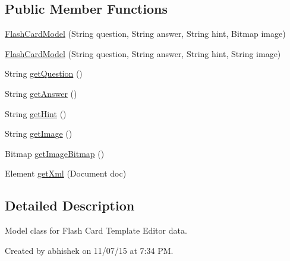 \subsection*{Public Member Functions}
\begin{DoxyCompactItemize}
\item 
\hyperlink{classorg_1_1buildmlearn_1_1toolkit_1_1templates_1_1FlashCardModel_a2dd9b2a68f1b2b6ada40d09b5a641f64}{Flash\-Card\-Model} (String question, String answer, String hint, Bitmap image)
\item 
\hyperlink{classorg_1_1buildmlearn_1_1toolkit_1_1templates_1_1FlashCardModel_ab57e165bc61b3bc72c50a7fbadabedbe}{Flash\-Card\-Model} (String question, String answer, String hint, String image)
\item 
String \hyperlink{classorg_1_1buildmlearn_1_1toolkit_1_1templates_1_1FlashCardModel_abf8ce19f627a4783f734dd05366c83be}{get\-Question} ()
\item 
String \hyperlink{classorg_1_1buildmlearn_1_1toolkit_1_1templates_1_1FlashCardModel_af7ada5f29f1967ffe976b8c1ac513c5e}{get\-Answer} ()
\item 
String \hyperlink{classorg_1_1buildmlearn_1_1toolkit_1_1templates_1_1FlashCardModel_a89685e7a56be83bd6718ba0b3eb88eb0}{get\-Hint} ()
\item 
String \hyperlink{classorg_1_1buildmlearn_1_1toolkit_1_1templates_1_1FlashCardModel_a80528eb28bb619a07090f7766f2de410}{get\-Image} ()
\item 
Bitmap \hyperlink{classorg_1_1buildmlearn_1_1toolkit_1_1templates_1_1FlashCardModel_acc164af071d93c3ab9348310f3dbf8aa}{get\-Image\-Bitmap} ()
\item 
Element \hyperlink{classorg_1_1buildmlearn_1_1toolkit_1_1templates_1_1FlashCardModel_a08112a6fbb90f87602d2b96da37e8cd8}{get\-Xml} (Document doc)
\end{DoxyCompactItemize}


\subsection{Detailed Description}
Model class for Flash Card Template Editor data. 

Created by abhishek on 11/07/15 at 7\-:34 P\-M. 

